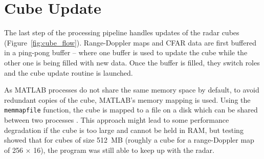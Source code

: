 \section{Cube Update}

The last step of the processing pipeline handles updates of the radar cubes (Figure~\ref{fig:cube_flow}).
Range-Doppler maps and CFAR data are first buffered in a ping-pong buffer -- where one buffer is used to update the cube while the other one is being filled with new data.
Once the buffer is filled, they switch roles and the cube update routine is launched.

As MATLAB processes do not share the same memory space by default, to avoid redundant copies of the cube, MATLAB's memory mapping is used.
Using the \texttt{memmapfile} function, the cube is mapped to a file on a disk which can be shared between two processes \cite{matlab_memory}.
This approach might lead to some performance degradation if the cube is too large and cannot be held in RAM, but testing showed that for cubes of size 512~MB (roughly a cube for a range-Doppler map of 256 $\times$ 16), the program was still able to keep up with the radar.



